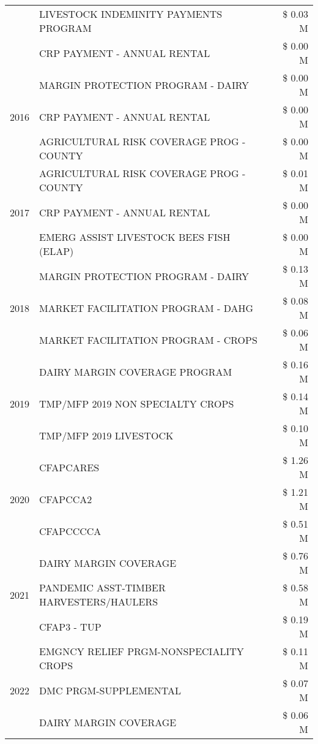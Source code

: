 \begin{tabular}{llr}
 & LIVESTOCK INDEMINITY PAYMENTS PROGRAM & \$ 0.03 M \\
 & CRP PAYMENT - ANNUAL RENTAL & \$ 0.00 M \\
\cline{1-3}
\multirow[t]{3}{*}{2016} & MARGIN PROTECTION PROGRAM - DAIRY & \$ 0.00 M \\
 & CRP PAYMENT - ANNUAL RENTAL & \$ 0.00 M \\
 & AGRICULTURAL RISK COVERAGE PROG - COUNTY & \$ 0.00 M \\
\cline{1-3}
\multirow[t]{3}{*}{2017} & AGRICULTURAL RISK COVERAGE PROG - COUNTY & \$ 0.01 M \\
 & CRP PAYMENT - ANNUAL RENTAL & \$ 0.00 M \\
 & EMERG ASSIST LIVESTOCK BEES FISH (ELAP) & \$ 0.00 M \\
\cline{1-3}
\multirow[t]{3}{*}{2018} & MARGIN PROTECTION PROGRAM - DAIRY & \$ 0.13 M \\
 & MARKET FACILITATION PROGRAM - DAHG & \$ 0.08 M \\
 & MARKET FACILITATION PROGRAM - CROPS & \$ 0.06 M \\
\cline{1-3}
\multirow[t]{3}{*}{2019} & DAIRY MARGIN COVERAGE PROGRAM & \$ 0.16 M \\
 & TMP/MFP 2019 NON SPECIALTY CROPS & \$ 0.14 M \\
 & TMP/MFP 2019 LIVESTOCK & \$ 0.10 M \\
\cline{1-3}
\multirow[t]{3}{*}{2020} & CFAPCARES & \$ 1.26 M \\
 & CFAPCCA2 & \$ 1.21 M \\
 & CFAPCCCCA & \$ 0.51 M \\
\cline{1-3}
\multirow[t]{3}{*}{2021} & DAIRY MARGIN COVERAGE & \$ 0.76 M \\
 & PANDEMIC ASST-TIMBER HARVESTERS/HAULERS & \$ 0.58 M \\
 & CFAP3 - TUP & \$ 0.19 M \\
\cline{1-3}
\multirow[t]{3}{*}{2022} & EMGNCY RELIEF PRGM-NONSPECIALITY CROPS & \$ 0.11 M \\
 & DMC PRGM-SUPPLEMENTAL & \$ 0.07 M \\
 & DAIRY MARGIN COVERAGE & \$ 0.06 M \\
\cline{1-3}
\bottomrule
\end{tabular}
